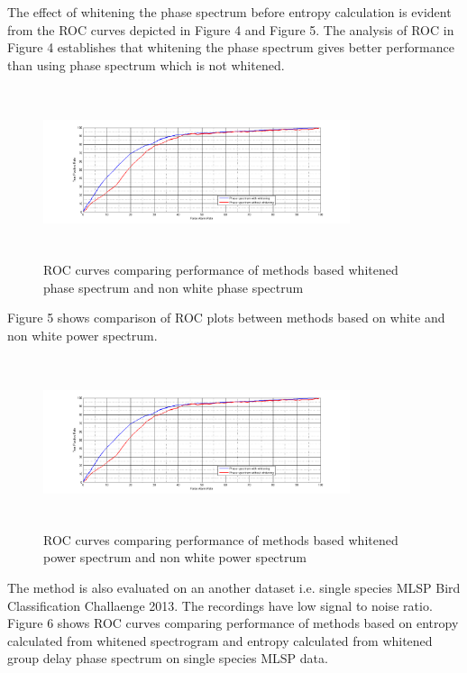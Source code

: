 \documentclass[a4paper]{article}
\begin{document}
The effect of whitening the phase spectrum before entropy calculation is evident from the ROC curves depicted in Figure 4 and Figure 5. The analysis of ROC in Figure 4 establishes that whitening the phase spectrum gives better performance than using phase spectrum which is not whitened. 

\begin{figure}[!ht]
	\centering
	\includegraphics[width=9cm, height=5cm]{phase_non_white_vs_phase_white}
	\caption{ROC curves comparing performance of methods based whitened phase spectrum and non white phase spectrum}   
\end{figure} 
 
 Figure 5 shows comparison of ROC plots between methods based on white and non white power spectrum. 
 
 \begin{figure}[!ht]
 	\centering
 	\includegraphics[width=9cm, height=5cm]{phase_non_white_vs_phase_white}
 	\caption{ROC curves comparing performance of methods based whitened power spectrum and non white power spectrum}   
 \end{figure} 
 
 
 
 
The method is also evaluated on an another dataset i.e. single species MLSP Bird Classification Challaenge 2013. The recordings have low signal to noise ratio.  Figure 6 shows ROC curves comparing performance of methods based on entropy calculated from whitened spectrogram and entropy calculated from whitened group delay phase spectrum on single species MLSP data.
\end{document}
